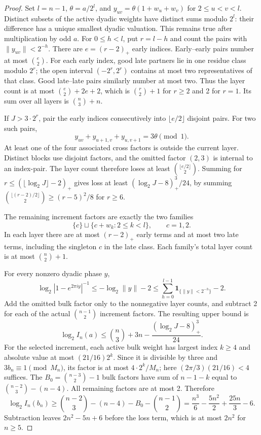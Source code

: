 \begin{proof}
Set $l=n-1$, $\theta=a/2^l$, and
$y_{uv}=\theta(1+w_u+w_v)$ for $2\le u<v<l$.
Distinct subsets of the active dyadic weights have distinct sums
modulo $2^l$: their difference has a unique smallest dyadic
valuation.  This remains true after multiplication by odd $a$.
For $0\le h<l$, put $r=l-h$ and count the pairs with
$\|y_{uv}\|<2^{-h}$.  There are $e=(r-2)_+$ early indices.
Early--early pairs number at most $\binom e2$.  For each early
index, good late partners lie in one residue class modulo $2^r$;
the open interval $(-2^r,2^r)$ contains at most two representatives
of that class.  Good late--late pairs similarly number at most
two.  Thus the layer count is at most
$\binom e2+2e+2$, which is $\binom r2+1$ for $r\ge2$ and 2
for $r=1$.  Its sum over all layers is $\binom n3+n$.

If $J>3\cdot2^r$, pair the early indices consecutively into
$\lfloor e/2\rfloor$ disjoint pairs.  For two such pairs,
\[
 y_{uv}+y_{u+1,v}+y_{u,v+1}=3\theta\pmod1.
\]
At least one of the four associated cross factors is outside the
current layer.  Distinct blocks use disjoint factors, and the
omitted factor $(2,3)$ is internal to an index-pair.  The layer
count therefore loses at least $\binom{\lfloor e/2\rfloor}{2}$.
Summing for $r\le(\lfloor\log_2J\rfloor-2)_+$ gives loss at
least $(\log_2J-8)_+^3/24$, by summing
$\binom{\lfloor(r-2)/2\rfloor}{2}\ge(r-5)^2/8$ for $r\ge6$.

The remaining increment factors are exactly the two families
\[
       \{c\}\sqcup\{c+w_k:2\le k<l\},\qquad c=1,2.
\]
In each layer there are at most $(r-2)_+$ early terms and at
most two late terms, including the singleton $c$ in the late
class.  Each family's total layer count is at most
$\binom n2+1$.

For every nonzero dyadic phase $y$,
\[
 \log_2|1-e^{2\pi iy}|^{-1}
   \le -\log_2\|y\|-2
   \le \sum_{h=0}^{l-1}\mathbf1_{\{\|y\|<2^{-h}\}}-2.
\]
Add the omitted bulk factor only to the nonnegative layer counts,
and subtract 2 for each of the actual $\binom{n-1}{2}$ increment
factors.  The resulting upper bound is
\[
 \log_2 I_n(a)\le\binom n3+3n
                    -\frac{(\log_2J-8)_+^3}{24}.
\]
For the selected increment, each active bulk weight has largest
index $k\ge4$ and absolute value at most $(21/16)2^k$.
Since it is divisible by three and $3b_n\equiv1\pmod{M_n}$,
its factor is at most $4\cdot2^k/M_n$; here
$(2\pi/3)(21/16)<4$ suffices.  The $B_0=\binom{n-3}{2}-1$
bulk factors have sum of $n-1-k$ equal to
$\binom{n-2}{3}-(n-4)$.  All remaining factors are at most 2.
Therefore
\[
 \log_2 I_n(b_n)\ge\binom{n-2}{3}-(n-4)-B_0-\binom{n-1}{2}
       =\frac{n^3}{6}-\frac{5n^2}{2}+\frac{25n}{3}-6.
\]
Subtraction leaves $2n^2-5n+6$ before the loss term, which is
at most $2n^2$ for $n\ge5$.
\end{proof}

